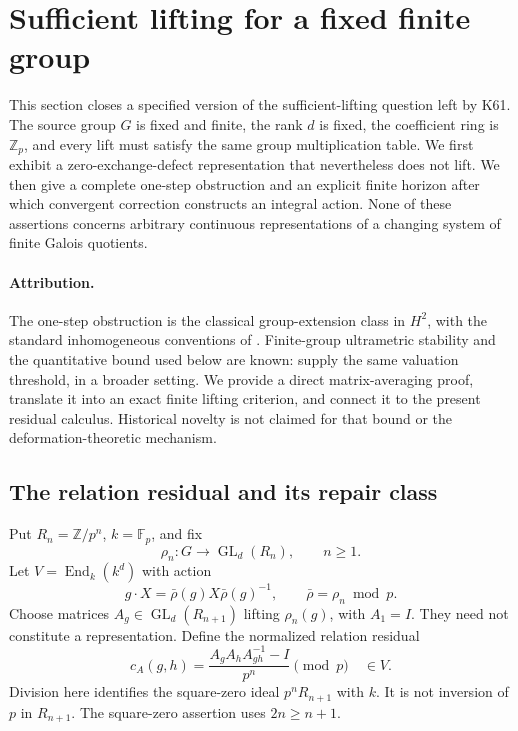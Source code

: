 \documentclass[11pt]{article}
\theoremstyle{definition}
\theoremstyle{remark}
\begin{document}
\section{Sufficient lifting for a fixed finite group}\label{sec:finite-lifting}

This section closes a specified version of the sufficient-lifting question left by K61. The source group $G$ is fixed and finite, the rank $d$ is fixed, the coefficient ring is $\mathbb Z_p$, and every lift must satisfy the same group multiplication table. We first exhibit a zero-exchange-defect representation that nevertheless does not lift. We then give a complete one-step obstruction and an explicit finite horizon after which convergent correction constructs an integral action. None of these assertions concerns arbitrary continuous representations of a changing system of finite Galois quotients.

\paragraph{Attribution.}
The one-step obstruction is the classical group-extension class in $H^2$, with the standard inhomogeneous conventions of \cite[Chapter II, 1.17--1.19]{MilneCFT2020}. Finite-group ultrametric stability and the quantitative bound used below are known: \cite[Lemma 7.3, Proposition 7.4, Example 7.5]{FournierFacio2026} supply the same valuation threshold, in a broader setting. We provide a direct matrix-averaging proof, translate it into an exact finite lifting criterion, and connect it to the present residual calculus. Historical novelty is not claimed for that bound or the deformation-theoretic mechanism.

\subsection{The relation residual and its repair class}

Put $R_n=\mathbb Z/p^n$, $k=\mathbb F_p$, and fix
\[
 \rho_n:G\longrightarrow\operatorname{GL}_d(R_n),\qquad n\geq1.
\]
Let $V=\operatorname{End}_k(k^d)$ with action
\[
 g\cdot X=\bar\rho(g)X\bar\rho(g)^{-1},
 \qquad \bar\rho=\rho_n\bmod p.
\]
Choose matrices $A_g\in\operatorname{GL}_d(R_{n+1})$ lifting $\rho_n(g)$, with $A_1=I$. They need not constitute a representation. Define the normalized relation residual
\[
 c_A(g,h)=\frac{A_gA_hA_{gh}^{-1}-I}{p^n}\pmod p\quad\in V.
\]
Division here identifies the square-zero ideal $p^nR_{n+1}$ with $k$. It is not inversion of $p$ in $R_{n+1}$. The square-zero assertion uses $2n\geq n+1$.
\end{document}

